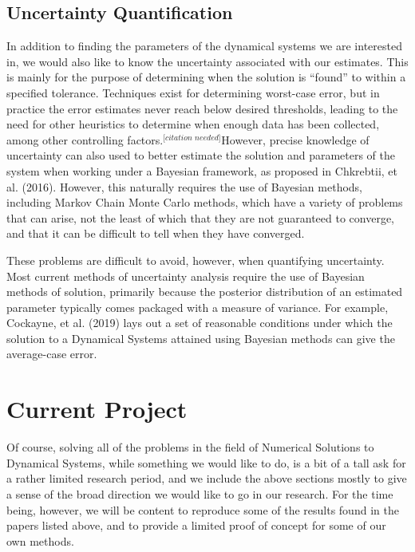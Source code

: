 \documentclass[12pt]{article}
\newcommand{\cn}{$^{\textit{[citation needed]}}$}
\begin{document}
\subsection{Uncertainty Quantification}

In addition to finding the parameters of the dynamical systems we are interested in, we would also like to know the uncertainty associated with our estimates. This is mainly for the purpose of determining when the solution is ``found'' to within a specified tolerance. Techniques exist for determining worst-case error, but in practice the error estimates never reach below desired thresholds, leading to the need for other heuristics to determine when enough data has been collected, among other controlling factors.\cn However, precise knowledge of uncertainty can also used to better estimate the solution and parameters of the system when working under a Bayesian framework, as proposed in Chkrebtii, et al. (2016). However, this naturally requires the use of Bayesian methods, including Markov Chain Monte Carlo methods, which have a variety of problems that can arise, not the least of which that they are not guaranteed to converge, and that it can be difficult to tell when they have converged.

These problems are difficult to avoid, however, when quantifying uncertainty. Most current methods of uncertainty analysis require the use of Bayesian methods of solution, primarily because the posterior distribution of an estimated parameter typically comes packaged with a measure of variance. For example, Cockayne, et al. (2019) lays out a set of reasonable conditions under which the solution to a Dynamical Systems attained using Bayesian methods can give the average-case error\cite{cockayne}.


\section{Current Project}

Of course, solving all of the problems in the field of Numerical Solutions to Dynamical Systems, while something we would like to do, is a bit of a tall ask for a rather limited research period, and we include the above sections mostly to give a sense of the broad direction we would like to go in our research. For the time being, however, we will be content to reproduce some of the results found in the papers listed above, and to provide a limited proof of concept for some of our own methods.
\end{document}
